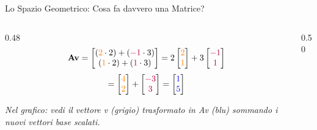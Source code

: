 \documentclass[aspectratio=169, 10pt]{beamer}
\begin{document}
\begin{frame}{Lo Spazio Geometrico: Cosa fa davvero una Matrice?}
\begin{columns}[T,onlytextwidth]
\begin{column}{0.48\textwidth}
            \vspace{0.05cm}
            \[
            \mathbf{A}\mathbf{v} = \begin{bmatrix} (\color{orange}2\color{black}\cdot 2) + (\color{purple}-1\color{black}\cdot 3) \\ (\color{orange}1\color{black}\cdot 2) + (\color{purple}1\color{black}\cdot 3) \end{bmatrix} =
            2 \begin{bmatrix} \color{orange}2 \\ \color{orange}1 \end{bmatrix} 
            + 3 \begin{bmatrix} \color{purple}-1 \\ \color{purple}1 \end{bmatrix} 
            \]
            \vspace{-0.1cm}
            \[
            = \begin{bmatrix} \color{orange}4 \\ \color{orange}2 \end{bmatrix} + \begin{bmatrix} \color{purple}-3 \\ \color{purple}3 \end{bmatrix} 
            = \begin{bmatrix} \color{blue}1 \\ \color{blue}5 \end{bmatrix}
            \]
            \vspace{0.05cm}
            
            \textit{\footnotesize Nel grafico: vedi il vettore v (grigio) trasformato in Av (blu) sommando i nuovi vettori base scalati.}
        \end{column}
        
        \begin{column}{0.50\textwidth}
            \centering
            \vspace{-0.2cm}
\end{column}
\end{columns}
\end{frame}
\end{document}
